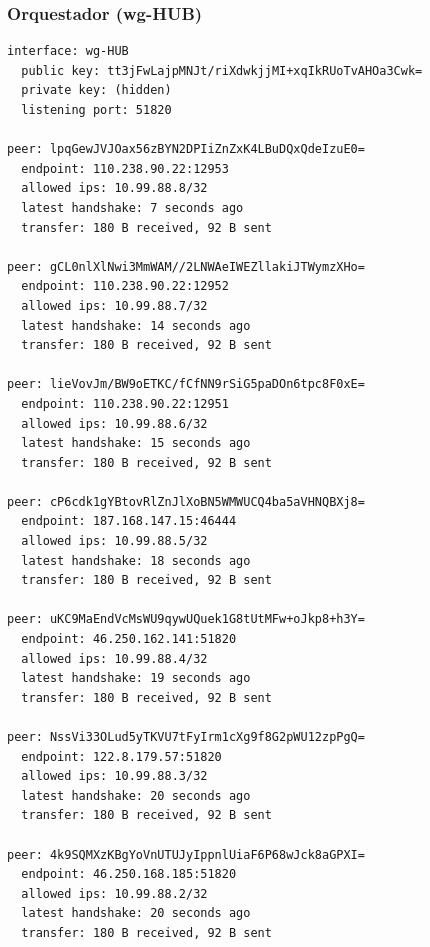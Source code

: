 \documentclass[11pt,a4paper]{article}
\begin{document}
\subsubsection*{Orquestador (wg-HUB)}
\begin{lstlisting}
interface: wg-HUB
  public key: tt3jFwLajpMNJt/riXdwkjjMI+xqIkRUoTvAHOa3Cwk=
  private key: (hidden)
  listening port: 51820

peer: lpqGewJVJOax56zBYN2DPIiZnZxK4LBuDQxQdeIzuE0=
  endpoint: 110.238.90.22:12953
  allowed ips: 10.99.88.8/32
  latest handshake: 7 seconds ago
  transfer: 180 B received, 92 B sent

peer: gCL0nlXlNwi3MmWAM//2LNWAeIWEZllakiJTWymzXHo=
  endpoint: 110.238.90.22:12952
  allowed ips: 10.99.88.7/32
  latest handshake: 14 seconds ago
  transfer: 180 B received, 92 B sent

peer: lieVovJm/BW9oETKC/fCfNN9rSiG5paDOn6tpc8F0xE=
  endpoint: 110.238.90.22:12951
  allowed ips: 10.99.88.6/32
  latest handshake: 15 seconds ago
  transfer: 180 B received, 92 B sent

peer: cP6cdk1gYBtovRlZnJlXoBN5WMWUCQ4ba5aVHNQBXj8=
  endpoint: 187.168.147.15:46444
  allowed ips: 10.99.88.5/32
  latest handshake: 18 seconds ago
  transfer: 180 B received, 92 B sent

peer: uKC9MaEndVcMsWU9qywUQuek1G8tUtMFw+oJkp8+h3Y=
  endpoint: 46.250.162.141:51820
  allowed ips: 10.99.88.4/32
  latest handshake: 19 seconds ago
  transfer: 180 B received, 92 B sent

peer: NssVi33OLud5yTKVU7tFyIrm1cXg9f8G2pWU12zpPgQ=
  endpoint: 122.8.179.57:51820
  allowed ips: 10.99.88.3/32
  latest handshake: 20 seconds ago
  transfer: 180 B received, 92 B sent

peer: 4k9SQMXzKBgYoVnUTUJyIppnlUiaF6P68wJck8aGPXI=
  endpoint: 46.250.168.185:51820
  allowed ips: 10.99.88.2/32
  latest handshake: 20 seconds ago
  transfer: 180 B received, 92 B sent

\end{lstlisting}
\end{document}
